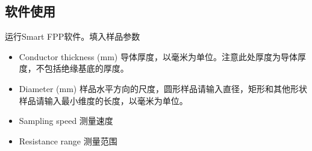 \documentclass[12pt]{ctexart}
\begin{document}
\subsection{软件使用}
运行Smart FPP软件。填入样品参数
\begin{itemize}
	\item Conductor thickness (mm) 导体厚度，以毫米为单位。注意此处厚度为导体厚度，不包括绝缘基底的厚度。
	\item Diameter (mm) 样品水平方向的尺度，圆形样品请输入直径，矩形和其他形状样品请输入最小维度的长度，以毫米为单位。
	\item Sampling speed 测量速度
	\item Resistance range 测量范围
\end{itemize}





	

\end{document}
